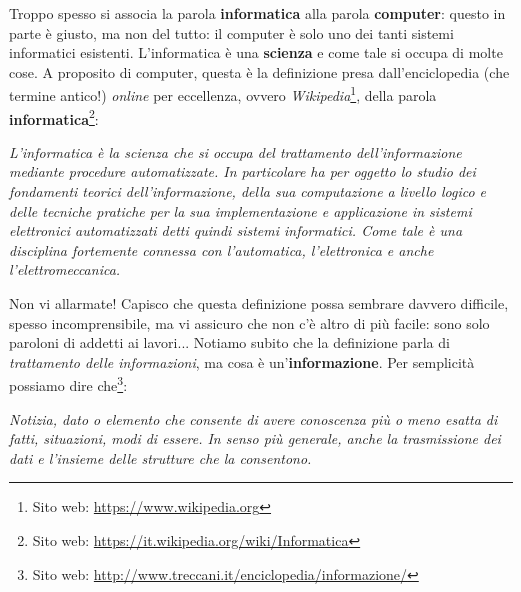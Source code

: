 \documentclass[11pt,fleqn,a5paper]{book} %
\begin{document}
    		    		
    		Troppo spesso si associa la parola \textbf{informatica} alla parola \textbf{computer}: questo in parte è giusto, ma non del tutto: il computer è solo uno dei tanti sistemi informatici esistenti. L'informatica è una \textbf{scienza} e come tale si occupa di molte cose.
    		A proposito di computer, questa è la definizione presa dall'enciclopedia (che termine antico!) \textit{online} per eccellenza, ovvero \textit{Wikipedia}\footnote{Sito web: \url{https://www.wikipedia.org}}, della parola \textbf{informatica}\footnote{Sito web: \url{https://it.wikipedia.org/wiki/Informatica}}:\\
    		
    		\begin{definition}[Informatica]\label{def: Informatica}
    			\textit{L'informatica è la scienza che si occupa del trattamento dell'informazione mediante procedure automatizzate. In particolare ha per oggetto lo studio dei fondamenti teorici dell'informazione, della sua computazione a livello logico e delle tecniche pratiche per la sua implementazione e applicazione in sistemi elettronici automatizzati detti quindi sistemi informatici. Come tale è una disciplina fortemente connessa con l'automatica, l'elettronica e anche l'elettromeccanica.}
    		\end{definition}
    	
    		Non vi allarmate! Capisco che questa definizione possa sembrare davvero difficile, spesso incomprensibile, ma vi assicuro che non c'è altro di più facile: sono solo paroloni di addetti ai lavori... Notiamo subito che la definizione parla di \textit{trattamento delle informazioni}, ma cosa è un'\textbf{informazione}. Per semplicità possiamo dire che\footnote{Sito web: \url{http://www.treccani.it/enciclopedia/informazione/}}:
    		\begin{definition}[Informazione]\label{def: Informazione}
    			\textit{Notizia, dato o elemento che consente di avere conoscenza più o meno esatta di fatti, situazioni, modi di essere. In senso più generale, anche la trasmissione dei dati e l’insieme delle strutture che la consentono.}
    		\end{definition}
    	
\end{document}
